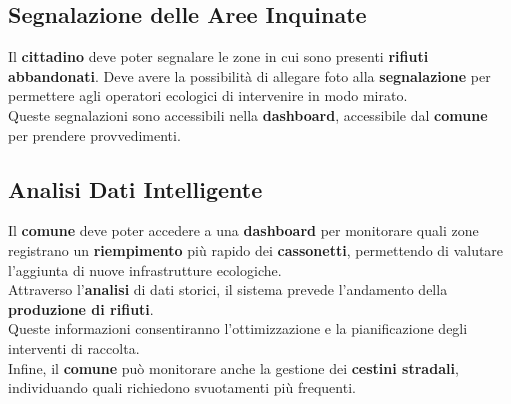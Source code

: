 \subsection{Segnalazione delle Aree Inquinate}

    Il \textbf{cittadino} deve poter segnalare le zone in cui sono presenti \textbf{rifiuti abbandonati}. Deve avere la possibilità di allegare foto alla \textbf{segnalazione} per permettere agli operatori ecologici di intervenire in modo mirato.
    \\Queste segnalazioni sono accessibili nella \textbf{dashboard}, accessibile dal \textbf{comune} per prendere provvedimenti.


\subsection{Analisi Dati Intelligente}

    Il \textbf{comune} deve poter accedere a una \textbf{dashboard} per monitorare quali zone registrano un \textbf{riempimento} più rapido dei \textbf{cassonetti}, permettendo di valutare l'aggiunta di nuove infrastrutture ecologiche.\\
    Attraverso l’\textbf{analisi} di dati storici, il sistema prevede l’andamento della \textbf{produzione di rifiuti}.\\Queste informazioni consentiranno l'ottimizzazione e la pianificazione degli interventi di raccolta.
    \\Infine, il \textbf{comune} può monitorare anche la gestione dei \textbf{cestini stradali}, individuando quali richiedono svuotamenti più frequenti.